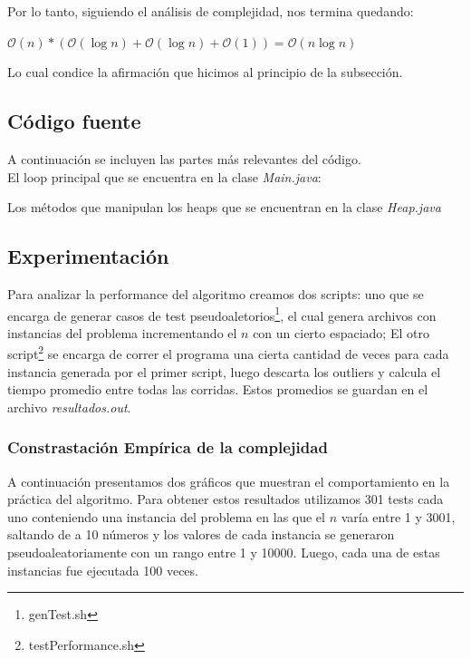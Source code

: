 \noindent Por lo tanto, siguiendo el análisis de complejidad, nos termina quedando:
\begin{center}
	$\mathcal{O}(n) * (\mathcal{O}(\log{}n) + \mathcal{O}(\log{}n) + \mathcal{O}(1)) = \mathcal{O}(n\log{}n)$
\end{center}
Lo cual condice la afirmación que hicimos al principio de la subsección.

\newpage
\subsection{Código fuente}
A continuación se incluyen las partes más relevantes del código.\\
El loop principal que se encuentra en la clase \emph{Main.java}:

Los métodos que manipulan los heaps que se encuentran en la clase \emph{Heap.java}




\subsection{Experimentación}
Para analizar la performance del algoritmo creamos dos scripts: uno que se encarga de generar casos de test pseudoaletorios\footnote{genTest.sh}, el cual genera archivos con instancias del problema incrementando el $n$ con un cierto espaciado; El otro script\footnote{testPerformance.sh} se encarga de correr el programa una cierta cantidad de veces para cada instancia generada por el primer script, luego descarta los outliers y calcula el tiempo promedio entre todas las corridas. Estos promedios se guardan en el archivo \emph{resultados.out}.

\subsubsection{Constrastación Empírica de la complejidad}
A continuación presentamos dos gráficos que muestran el comportamiento en la práctica del algoritmo. Para obtener estos resultados utilizamos 301 tests cada uno conteniendo una instancia del problema en las que el $n$ varía entre 1 y 3001, saltando de a 10 números y los valores de cada instancia se generaron pseudoaleatoriamente con un rango entre 1 y 10000. Luego, cada una de estas instancias fue ejecutada 100 veces.


